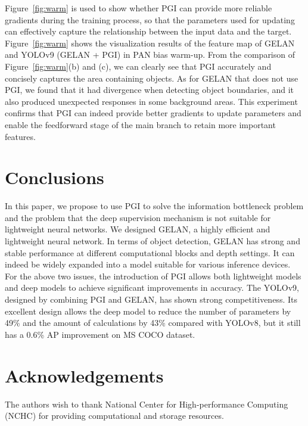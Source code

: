 \documentclass[10pt,twocolumn,letterpaper]{article}
\begin{document}
	\newpage
	
	Figure~\ref{fig:warm} is used to show whether PGI can provide more reliable gradients during the training process, so that the parameters used for updating can effectively capture the relationship between the input data and the target.  Figure~\ref{fig:warm} shows the visualization results of the feature map of GELAN and YOLOv9 (GELAN + PGI) in PAN bias warm-up.  From the comparison of Figure~\ref{fig:warm}(b) and (c), we can clearly see that PGI accurately and concisely captures the area containing objects.  As for GELAN that does not use PGI, we found that it had divergence when detecting object boundaries, and it also produced unexpected responses in some background areas.  This experiment confirms that PGI can indeed provide better gradients to update parameters and enable the feedforward stage of the main branch to retain more important features.
	
	\section{Conclusions}
	
	In this paper, we propose to use PGI to solve the information bottleneck problem and the problem that the deep supervision mechanism is not suitable for lightweight neural networks.  We designed GELAN, a highly efficient and lightweight neural network.  In terms of object detection, GELAN has strong and stable performance at different computational blocks and depth settings.  It can indeed be widely expanded into a model suitable for various inference devices.  For the above two issues, the introduction of PGI allows both lightweight models and deep models to achieve significant improvements in accuracy.  The YOLOv9, designed by combining PGI and GELAN, has shown strong competitiveness.  Its excellent design allows the deep model to reduce the number of parameters by 49\% and the amount of calculations by 43\% compared with YOLOv8, but it still has a 0.6\% AP improvement on MS COCO dataset.
	
	\section{Acknowledgements}
	
	The authors wish to thank National Center for High-performance Computing (NCHC) for providing computational and storage resources.
	
	\clearpage
	\clearpage
	\clearpage
	
\end{document}

